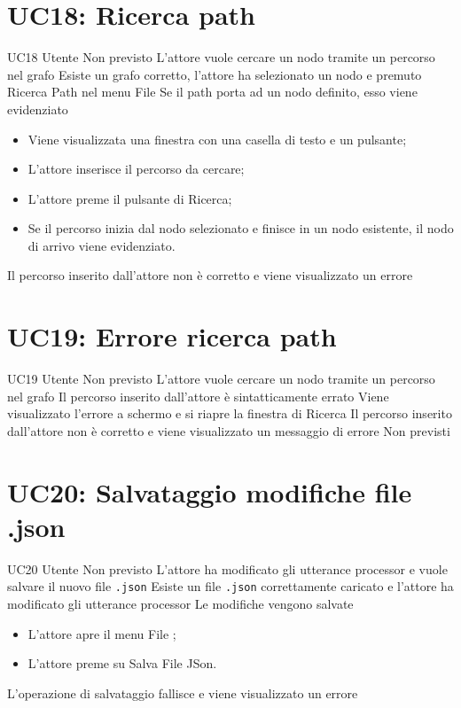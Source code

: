 \documentclass[../AnalisideiRequisiti.tex]{subfiles}
\begin{document}
\section{UC18: Ricerca path}

\UserCase
{UC18}
{Utente}
{Non previsto}
{L'attore vuole cercare un nodo tramite un percorso nel grafo}
{Esiste un grafo corretto, l'attore ha selezionato un nodo e premuto Ricerca Path nel menu File}
{Se il path porta ad un nodo definito, esso viene evidenziato}
{
	\begin{itemize}
		\item{} Viene visualizzata una finestra con una casella di testo e un pulsante;
		\item{} L'attore inserisce il percorso da cercare;
		\item{} L'attore preme il pulsante di Ricerca;
		\item{} Se il percorso inizia dal nodo selezionato e finisce in un nodo esistente, il nodo di arrivo viene evidenziato.
 	\end{itemize}
}
{Il percorso inserito dall'attore non è corretto e viene visualizzato un errore }

\section{UC19: Errore ricerca path}
\UserCase
{UC19}
{Utente}
{Non previsto}
{L'attore vuole cercare un nodo tramite un percorso nel grafo}
{Il percorso inserito dall'attore è sintatticamente errato}
{Viene visualizzato l'errore a schermo e si riapre la finestra di Ricerca }
{Il percorso inserito dall'attore non è corretto e viene visualizzato un messaggio di errore}
{Non previsti}

\section{UC20: Salvataggio modifiche file .json}

\UserCase
{UC20}
{Utente}
{Non previsto}
{L'attore ha modificato gli utterance processor e vuole salvare il nuovo file \verb|.json|}
{Esiste un file \verb|.json| correttamente caricato  e l'attore ha modificato gli utterance processor  }
{Le modifiche vengono salvate}
{
	\begin{itemize}
		\item{} L'attore apre il menu File ;
		\item{} L'attore preme su Salva File JSon.
	\end{itemize}
}
{L'operazione di salvataggio fallisce e viene visualizzato un errore }
\end{document}
